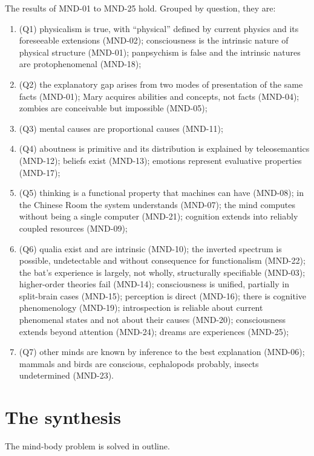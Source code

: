 \documentclass{situationist-preprint}
\begin{document}
\begin{assumption}\label{a:results}
The results of MND-01 to MND-25 hold. Grouped by question, they are:
\begin{enumerate}[label=(\alph*)]
\item (Q1) physicalism is true, with \enquote{physical} defined by current physics and its foreseeable extensions (MND-02); consciousness is the intrinsic nature of physical structure (MND-01); panpsychism is false and the intrinsic natures are protophenomenal (MND-18);
\item (Q2) the explanatory gap arises from two modes of presentation of the same facts (MND-01); Mary acquires abilities and concepts, not facts (MND-04); zombies are conceivable but impossible (MND-05);
\item (Q3) mental causes are proportional causes (MND-11);
\item (Q4) aboutness is primitive and its distribution is explained by teleosemantics (MND-12); beliefs exist (MND-13); emotions represent evaluative properties (MND-17);
\item (Q5) thinking is a functional property that machines can have (MND-08); in the Chinese Room the system understands (MND-07); the mind computes without being a single computer (MND-21); cognition extends into reliably coupled resources (MND-09);
\item (Q6) qualia exist and are intrinsic (MND-10); the inverted spectrum is possible, undetectable and without consequence for functionalism (MND-22); the bat's experience is largely, not wholly, structurally specifiable (MND-03); higher-order theories fail (MND-14); consciousness is unified, partially in split-brain cases (MND-15); perception is direct (MND-16); there is cognitive phenomenology (MND-19); introspection is reliable about current phenomenal states and not about their causes (MND-20); consciousness extends beyond attention (MND-24); dreams are experiences (MND-25);
\item (Q7) other minds are known by inference to the best explanation (MND-06); mammals and birds are conscious, cephalopods probably, insects undetermined (MND-23).
\end{enumerate}
\end{assumption}

\section{The synthesis}

\begin{theorem}\label{t:main}
The mind-body problem is solved in outline.
\end{theorem}
\end{document}
